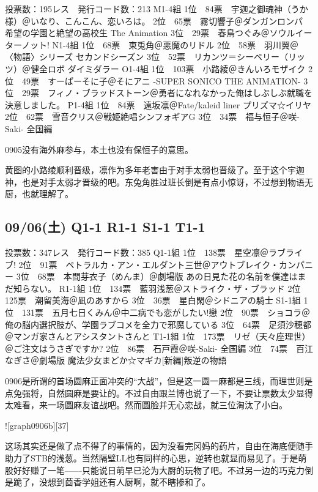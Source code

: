 	投票数：195レス　発行コード数：213
	M1-4組
	1位　84票　宇迦之御魂神（うか様）＠いなり、こんこん、恋いろは。
	2位　65票　霧切響子＠ダンガンロンパ 希望の学園と絶望の高校生 The Animation
	3位　29票　春鳥つぐみ＠ソウルイーターノット!
	N1-4組
	1位　68票　東兎角＠悪魔のリドル
	2位　58票　羽川翼＠〈物語〉シリーズ セカンドシーズン
	3位　52票　リカンツ＝シーベリー（リッツ）＠健全ロボ ダイミダラー
	O1-4組
	1位　103票　小路綾＠きんいろモザイク
	2位　49票　すーぱーそに子＠そにアニ -SUPER SONICO THE ANIMATION-
	3位　29票　フィノ・ブラッドストーン＠勇者になれなかった俺はしぶしぶ就職を決意しました。
	P1-4組
	1位　84票　遠坂凛＠Fate/kaleid liner プリズマ☆イリヤ
	2位　62票　雪音クリス＠戦姫絶唱シンフォギアG
	3位　34票　福与恒子＠咲-Saki- 全国編

0905没有海外麻参与，本土也没有保恒子的意思。

黄图的小路绫顺利晋级，凛作为多年老害由于对手太弱也晋级了。至于这个宇迦神，也是对手太弱才晋级的吧。东兔角胜过班长倒是有点小惊讶，不过想到物语无厨，也就理解了。

\subsection{09/06(土) Q1-1 R1-1 S1-1 T1-1}

	投票数：347レス　発行コード数：385
	Q1-1組
	1位　138票　星空凛＠ラブライブ!
	2位　91票　ペトラルカ・アン・エルダント三世＠アウトブレイク・カンパニー
	3位　68票　本間芽衣子（めんま）＠劇場版 あの日見た花の名前を僕達はまだ知らない。
	R1-1組
	1位　134票　藍羽浅葱＠ストライク・ザ・ブラッド
	2位　125票　潮留美海＠凪のあすから
	3位　36票　星白閑＠シドニアの騎士
	S1-1組
	1位　131票　五月七日くみん＠中二病でも恋がしたい!戀
	2位　90票　ショコラ＠俺の脳内選択肢が、学園ラブコメを全力で邪魔している
	3位　64票　足須沙穂都＠マンガ家さんとアシスタントさんと
	T1-1組
	1位　173票　リゼ（天々座理世）＠ご注文はうさぎですか?
	2位　86票　石戸霞＠咲-Saki- 全国編
	3位　74票　百江なぎさ＠劇場版 魔法少女まどか☆マギカ[新編]叛逆の物語

0906是所谓的首场圆麻正面冲突的“大战”，但是这一圆一麻都是三线，而理世则是点兔强将，自然圆麻是要让的。不过自由跟兰博也说了一下，不要让票数太少显得太难看，来一场圆麻友谊战吧。然而圆脸并无心恋战，就三位淘汰了小白。

![graph0906b][37]

这场其实还是做了点不得了的事情的，因为没看完冈妈的药片，自由在海底便随手助力了STB的浅葱。当然隔壁LL也有同样的心思，逆转也就显而易见了。于是萌股好好赚了一笔——只能说日萌早已沦为大厨的玩物了吧。不过另一边的巧克力倒是跪了，没想到茴香学姐还有人厨啊，就不瞎掺和了。


